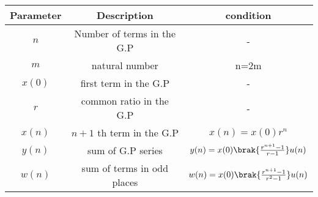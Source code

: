 
\begin{tabular}{|c|c|c|}
\hline
Parameter & Description & condition\\
\hline
\( n \) & Number of terms in the G.P & - \\
\hline
\( m \) & natural number & n=2m \\
\hline
\(x(0) \) & first term in the G.P & -\\
\hline
\( r \) & common ratio in the G.P & - \\
\hline
\( x(n) \) & $n+1$ th term in the G.P & $x(n)=x(0)r^{n}$\\
\hline
\( y(n) \) & sum of G.P series & $y(n)=x(0)\brak{\frac{r^{n+1}-1}{r-1}}u(n)$\\
\hline
\( w(n) \) & sum of terms in odd places & $w(n)=x(0)\brak{\frac{r^{n+1}-1}{r^2-1}}u(n)$\\
\hline
\end{tabular}



